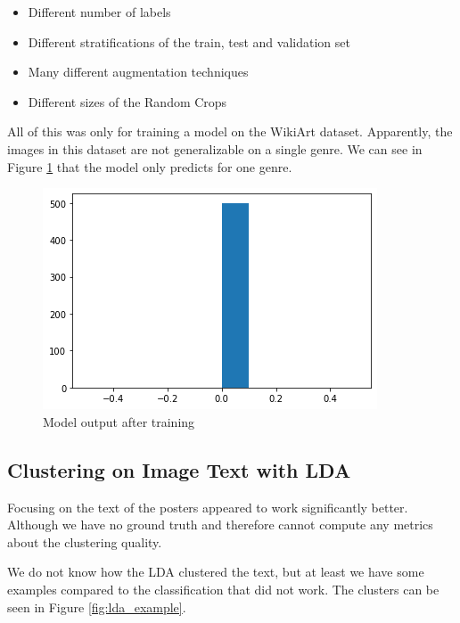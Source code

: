 \documentclass[conference]{IEEEtran}
\begin{document}
\begin{itemize}
\item Different number of labels
\item Different stratifications of the train, test and validation set
\item Many different augmentation techniques
\item Different sizes of the Random Crops
\end{itemize} 

All of this was only for training a model on the WikiArt dataset. Apparently, the images in this dataset are not generalizable on a single genre. We can see in Figure \ref{fig:pred} that the model only predicts for one genre. 

\begin{figure}
\centering
\includegraphics[width=1\linewidth]{../Imgs/prediction_nn}
\caption{Model output after training}
\label{fig:pred}
\end{figure}

\subsection{Clustering on Image Text with LDA}
Focusing on the text of the posters appeared to work significantly better. Although we have no ground truth and therefore cannot compute any metrics about the clustering quality.

We do not know how the LDA clustered the text, but at least we have some examples compared to the classification that did not work. The clusters can be seen in Figure \ref{fig:lda_example}.
\end{document}
